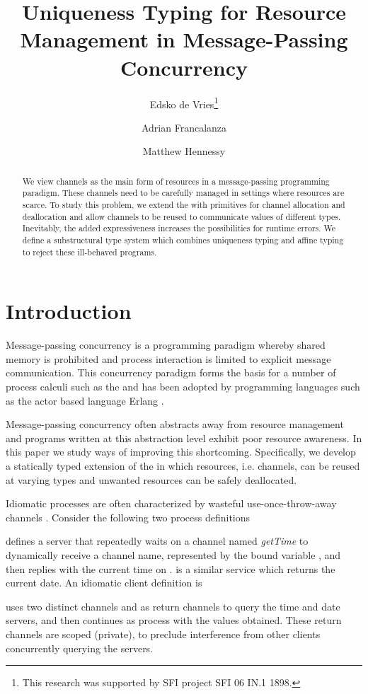 \documentclass[copyright]{eptcs}
\title{Uniqueness Typing for Resource Management in Message-Passing Concurrency}
\author{
  Edsko de Vries\thanks{This research was supported by SFI project SFI 06 IN.1 1898.}
  \institute{Trinity College Dublin, Ireland}
  \email{Edsko.de.Vries@cs.tcd.ie}
  \and
  Adrian Francalanza
  \institute{University of Malta}
  \email{Adrian.Francalanza@um.edu.mt}
  \and
  Matthew Hennessy\footnotemark[1]
  \institute{Trinity College Dublin, Ireland}
  \email{Matthew.Hennessy@cs.tcd.ie}
}
\begin{document}
\maketitle

\begin{abstract}
We view channels as the main form of resources in a message-passing programming
paradigm.  These channels need to be carefully managed in settings where
resources are scarce.  To study this problem, we extend the \pic with
primitives for channel allocation and deallocation and allow channels to be
reused to communicate values of different types.  Inevitably, the added
expressiveness increases the possibilities for runtime errors. We define a
substructural type system which combines uniqueness typing and affine typing to
reject these ill-behaved programs.
\end{abstract}

\section{Introduction}

Message-passing concurrency is a programming paradigm whereby shared memory is
prohibited and process interaction is limited to explicit message
communication. This concurrency paradigm forms the basis for a number of
process calculi such as the \pic \cite{Milner:Pi} and has been adopted by
programming languages such as the actor based language Erlang
\cite{Armstrong:Erlang}.   

Message-passing concurrency often abstracts away from resource management and
programs written at this abstraction level exhibit poor resource awareness. In
this paper we study ways of improving this shortcoming. Specifically, we
develop a statically typed extension of the \pic in which resources, i.e.
channels, can be reused at varying types and unwanted resources can be safely
deallocated. 

Idiomatic \pic processes are often characterized by wasteful
use-once-throw-away channels \cite{Milner:Pi,KobayashiPT:linearity}.  Consider
the following two \pic process definitions
 
 defines a server that repeatedly waits on a channel named
\textit{getTime} to dynamically receive a channel name, represented by
the bound variable , and then replies with the current time on .
 is a similar service which returns the current date.  An
idiomatic \pic client definition is

 uses two distinct channels  and
 as return channels to query the time and date servers, and
then continues as process  with the values obtained. These return
channels are scoped (private), to preclude interference from other clients
concurrently querying the servers.  
\end{document}

